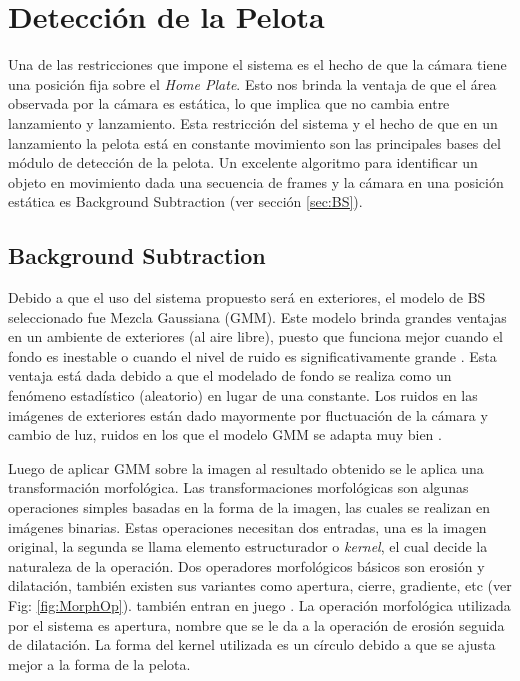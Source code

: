 \section{Detección de la Pelota}

Una de las restricciones que impone el sistema es el hecho de que la cámara tiene una posición fija sobre el \textit{Home Plate}. Esto nos brinda la ventaja de que el área observada por la cámara es estática, lo que implica que no cambia entre lanzamiento y lanzamiento. Esta restricción del sistema y el hecho de que en un lanzamiento la pelota está en constante movimiento son las principales bases del módulo de detección de la pelota. Un excelente algoritmo para identificar un objeto en movimiento dada una secuencia de frames y la cámara en una posición estática es Background Subtraction (ver sección \ref{sec:BS}).

\subsection{Background Subtraction}

Debido a que el uso del sistema propuesto será en exteriores, el modelo de BS seleccionado fue Mezcla Gaussiana (GMM). Este modelo brinda grandes ventajas en un ambiente de exteriores (al aire libre), puesto que funciona mejor cuando el fondo es inestable o cuando el nivel de ruido es significativamente grande \cite{YannickPierreMarcBrunoHeleneChristophe}. Esta ventaja está dada debido a que el modelado de fondo se realiza como un fenómeno estadístico (aleatorio) en lugar de una constante. Los ruidos en las imágenes de exteriores están dado mayormente por fluctuación de la cámara y cambio de luz, ruidos en los que el modelo GMM se adapta muy bien \cite{GMM}.

Luego de aplicar GMM sobre la imagen al resultado obtenido se le aplica una transformación morfológica. Las transformaciones morfológicas son algunas operaciones simples basadas en la forma de la imagen, las cuales se realizan en imágenes binarias. Estas operaciones necesitan dos entradas, una es la imagen original, la segunda se llama elemento estructurador o \textit{kernel}, el cual decide la naturaleza de la operación. Dos operadores morfológicos básicos son erosión y dilatación, también existen sus variantes como apertura, cierre, gradiente, etc (ver Fig: \ref{fig:MorphOp}). también entran en juego \cite{MorphologicalTransformationsOpenCV}. La operación morfológica utilizada por el sistema es apertura, nombre que se le da a la operación de erosión seguida de dilatación. La forma del kernel utilizada es un círculo debido a que se ajusta mejor a la forma de la pelota.

